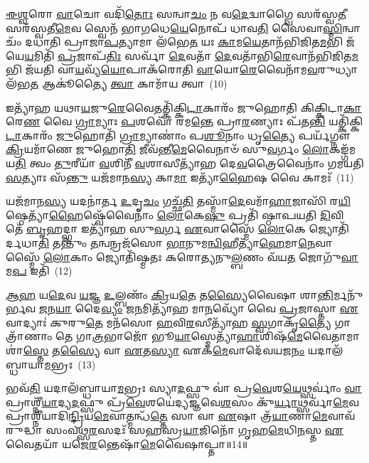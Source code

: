 \-\ul{𑌈}\-\-\ul{𑌶𑍍𑌵}\-𑌰𑍋 \ul{𑌵𑌾}\-𑌚𑍋 𑌵𑌦𑌿᳴\-\ul{𑌤𑍋𑌃} 𑌸𑌨𑍍𑌵𑌾\-\ul{𑌚𑌂} 𑌨 𑌵\-\ul{𑌦𑍇}\-𑌦𑍍𑌵𑌾𑌗𑍍𑌵𑍈 𑌸𑌰᳴𑌸𑍍𑌵\-\ul{𑌤𑍀} 𑌸𑌰᳴𑌸𑍍𑌵𑌤𑍀\-\ul{𑌮𑍇}\-𑌵 𑌸𑍍𑌵𑍇𑌨᳴ 𑌭𑌾\-\ul{𑌗}\-𑌧𑍇\-\ul{𑌯𑍇}\-𑌨𑍋𑌪᳴ 𑌧𑌾𑌵\-\ul{𑌤𑌿} 𑌸𑍈𑌵𑌾\-\ul{𑌸𑍍𑌮𑌿}\-𑌨𑍍𑌵𑌾𑌚𑌂᳴ 𑌦𑌧𑌾𑌤𑌿 𑌪𑍍𑌰𑌾𑌜𑌾\-\ul{𑌪}\-𑌤𑍍𑌯𑌾𑌮𑌾 𑌲᳴𑌭𑍇\-\ul{𑌤} 𑌯𑌃 \ul{𑌕𑌾}\-𑌮\-\ul{𑌯𑍇}\-𑌤𑌾𑌨᳴𑌭𑌿𑌜𑌿𑌤\-\ul{𑌮}\-𑌭𑌿 𑌜᳴𑌯𑍇\-\ul{𑌯}\-𑌮𑌿𑌤𑌿᳴ \ul{𑌪𑍍𑌰}\-𑌜𑌾𑌪᳴\-\ul{𑌤𑌿𑌃} 𑌸𑌰𑍍𑌵𑌾᳴ \ul{𑌦𑍇}\-𑌵𑌤𑌾᳴ \ul{𑌦𑍇}\-𑌵𑌤𑌾᳴𑌭𑌿\-\ul{𑌰𑍇}\-𑌵𑌾𑌨᳴𑌭𑌿\-𑌜𑌿𑌤\-\ul{𑌮}\-𑌭𑌿 𑌜᳴𑌯𑌤𑌿 𑌵𑌾\-\ul{𑌯}\-𑌵𑍍𑌯᳴\-\ul{𑌯𑍋}\-𑌪𑌾𑌕᳴𑌰𑍋𑌤𑌿 \ul{𑌵𑌾}\-𑌯𑍋\-\ul{𑌰𑍇}\-𑌵𑍈𑌨𑌾᳴𑌮\-\ul{𑌵}\-𑌰𑍁𑌧𑍍𑌯𑌾 𑌲᳴𑌭\-\ul{𑌤} 𑌆𑌕𑍂॑𑌤𑍍𑌯𑍈 \ul{𑌤𑍍𑌵𑌾} 𑌕𑌾𑌮𑌾᳴𑌯 𑌤𑍍𑌵𑌾~(10)

𑌇𑌤𑍍𑌯𑌾᳴𑌹 𑌯𑌥𑌾\-\ul{𑌯}\-𑌜𑍁\-\ul{𑌰𑍇}\-𑌵𑍈𑌤𑌤𑍍𑌕𑌿᳴𑌕𑍍𑌕𑌿\-\ul{𑌟𑌾}\-𑌕𑌾𑌰𑌂᳴ 𑌜𑍁𑌹𑍋𑌤𑌿 𑌕𑌿𑌕𑍍𑌕𑌿𑌟𑌾\-\ul{𑌕𑌾}\-𑌰𑍇\-\ul{𑌣} 𑌵𑍈 \ul{𑌗𑍍𑌰𑌾}\-𑌮𑍍𑌯𑌾𑌃 \ul{𑌪}\-𑌶𑌵𑍋᳴ 𑌰𑌮\-\ul{𑌨𑍍𑌤𑍇} 𑌪𑍍𑌰𑌾\-\ul{𑌰}\-𑌣𑍍𑌯𑌾𑌃 𑌪᳴𑌤\-\ul{𑌨𑍍𑌤𑌿} 𑌯𑌤𑍍𑌕𑌿᳴𑌕𑍍𑌕𑌿\-\ul{𑌟𑌾}\-𑌕𑌾𑌰𑌂᳴ \ul{𑌜𑍁}\-𑌹𑍋𑌤𑌿᳴ \ul{𑌗𑍍𑌰𑌾}\-𑌮𑍍𑌯𑌾𑌣𑌾𑌂॑ 𑌪\-\ul{𑌶𑍂}\-𑌨𑌾𑌂 𑌧𑍃\-\ul{𑌤𑍍𑌯𑍈} 𑌪𑌰𑍍𑌯᳴𑌗𑍍𑌨𑍗 \ul{𑌕𑍍𑌰𑌿}\-𑌯𑌮𑌾᳴𑌣𑍇 𑌜𑍁𑌹𑍋\-\ul{𑌤𑌿} 𑌜𑍀𑌵᳴𑌨𑍍𑌤𑍀\-\ul{𑌮𑍇}\-𑌵𑍈𑌨𑌾𑍞᳴ 𑌸𑍁\-\ul{𑌵}\-𑌰𑍍𑌗𑌂 \ul{𑌲𑍋}\-𑌕𑌙𑍍𑌗᳴𑌮𑌯\-\ul{𑌤𑌿} 𑌤𑍍𑌵𑌂 \ul{𑌤𑍁}\-𑌰𑍀𑌯𑌾᳴ \ul{𑌵}\-𑌶𑌿𑌨𑍀᳴ \ul{𑌵}\-𑌶𑌾𑌸𑍀𑌤𑍍𑌯𑌾᳴𑌹 𑌦𑍇\-\ul{𑌵}\-𑌤𑍍𑌰𑍈𑌵𑍈𑌨𑌾𑌂॑ 𑌗𑌮𑌯𑌤𑌿 \ul{𑌸}\-𑌤𑍍𑌯𑌾𑌃 𑌸᳴\-\ul{𑌨𑍍𑌤𑍁} 𑌯𑌜᳴𑌮𑌾𑌨\-\ul{𑌸𑍍𑌯} 𑌕𑌾\-\ul{𑌮𑌾} 𑌇𑌤𑍍𑌯𑌾᳴\-\ul{𑌹𑍈}\-𑌷 𑌵𑍈 𑌕𑌾𑌮𑌃᳴~(11)

𑌯𑌜᳴𑌮𑌾𑌨\-\ul{𑌸𑍍𑌯} 𑌯𑌦𑌨𑌾॑𑌰𑍍𑌤 \ul{𑌉}\-𑌦𑍃\-\ul{𑌚𑌂} 𑌗𑌚𑍍𑌛᳴\-\ul{𑌤𑌿} 𑌤𑌸𑍍𑌮𑌾᳴\-\ul{𑌦𑍇}\-𑌵𑌮𑌾᳴\-\ul{𑌹𑌾}\-𑌜𑌾𑌸𑌿᳴ 𑌰\-\ul{𑌯𑌿}\-𑌷𑍍𑌠𑍇𑌤𑍍𑌯𑌾᳴\-\ul{𑌹𑍈}\-𑌷𑍍𑌵𑍇᳴𑌵𑍈𑌨𑌾𑌂॑ \ul{𑌲𑍋}\-𑌕𑍇\-\ul{𑌷𑍁} 𑌪𑍍𑌰𑌤𑌿᳴ 𑌷𑍍𑌠𑌾𑌪𑌯𑌤𑌿 \ul{𑌦𑌿}\-𑌵𑌿 𑌤𑍇᳴ \ul{𑌬𑍃}\-𑌹𑌦𑍍𑌭𑌾 𑌇𑌤𑍍𑌯𑌾᳴𑌹 𑌸𑍁\-\ul{𑌵}\-𑌰𑍍𑌗 \ul{𑌏}\-𑌵𑌾𑌸𑍍𑌮𑍈᳴ \ul{𑌲𑍋}\-𑌕𑍇 𑌜𑍍𑌯𑍋𑌤𑌿᳴𑌰𑍍𑌦𑌧𑌾\-\ul{𑌤𑌿} 𑌤𑌨𑍍𑌤𑍁𑌂᳴ \ul{𑌤}\-𑌨𑍍𑌵𑌨𑍍𑌰𑌜᳴𑌸𑍋 \ul{𑌭𑌾}\-𑌨𑍁𑌮\-\ul{𑌨𑍍𑌵𑌿}\-𑌹𑍀𑌤𑍍𑌯𑌾᳴\-\ul{𑌹𑍇}\-𑌮𑌾\-\ul{𑌨𑍇}\-𑌵𑌾𑌸𑍍𑌮𑍈᳴ \ul{𑌲𑍋}\-𑌕𑌾𑌂 𑌜𑍍𑌯𑍋𑌤𑌿᳴𑌷𑍍𑌮𑌤𑌃 𑌕𑌰𑍋𑌤𑍍𑌯𑌨𑍁\-\ul{𑌲𑍍𑌬}\-𑌣𑌂 𑌵᳴𑌯\-\ul{𑌤} 𑌜𑍋𑌗𑍁᳴\-\ul{𑌵𑌾}\-𑌮\-\ul{𑌪} 𑌇𑌤𑌿᳴~(12)

\-\ul{𑌆}\-\-\ul{𑌹} 𑌯\-\ul{𑌦𑍇}\-𑌵 \ul{𑌯}\-𑌜𑍍𑌞 \ul{𑌉}\-𑌲𑍍𑌬𑌣𑌂᳴ \ul{𑌕𑍍𑌰𑌿}\-𑌯\-\ul{𑌤𑍇} 𑌤\-\ul{𑌸𑍍𑌯𑍈}\-𑌵𑍈𑌷𑌾 𑌶𑌾\-\ul{𑌨𑍍𑌤𑌿}\-𑌰𑍍𑌮𑌨𑍁᳴𑌰𑍍𑌭𑌵 \ul{𑌜}\-𑌨\-\ul{𑌯𑌾} 𑌦𑍈\-\ul{𑌵𑍍𑌯𑌂} 𑌜\-\ul{𑌨}\-𑌮𑌿𑌤𑍍𑌯𑌾᳴𑌹 𑌮𑌾\-\ul{𑌨}\-𑌵𑍍𑌯𑍋᳴ 𑌵𑍈 \ul{𑌪𑍍𑌰}\-𑌜𑌾𑌸𑍍𑌤𑌾 \ul{𑌏}\-𑌵𑌾𑌦𑍍𑌯𑌾𑌃॑ 𑌕𑍁𑌰𑍁\-\ul{𑌤𑍇} 𑌮𑌨᳴𑌸𑍋 \ul{𑌹}\-𑌵𑌿\-\ul{𑌰}\-𑌸𑍀𑌤𑍍𑌯𑌾᳴𑌹 \ul{𑌸𑍍𑌵}\-𑌗𑌾𑌕𑍃᳴\-\ul{𑌤𑍍𑌯𑍈} 𑌗𑌾𑌤𑍍𑌰𑌾᳴𑌣𑌾𑌂 𑌤𑍇 𑌗𑌾\-\ul{𑌤𑍍𑌰}\-𑌭𑌾𑌜𑍋᳴ 𑌭𑍂\-\ul{𑌯𑌾}\-𑌸𑍍𑌮𑍇𑌤𑍍𑌯𑌾᳴\-\ul{𑌹𑌾}\-𑌶𑌿𑌷᳴\-\ul{𑌮𑍇}\-𑌵𑍈𑌤𑌾𑌮𑌾 𑌶𑌾॑\-\ul{𑌸𑍍𑌤𑍇} 𑌤\-\ul{𑌸𑍍𑌯𑍈} 𑌵𑌾 \ul{𑌏}\-𑌤\-\ul{𑌸𑍍𑌯𑌾} 𑌏𑌕᳴\-\ul{𑌮𑍇}\-𑌵𑌾𑌦𑍇᳴𑌵𑌯𑌜\-\ul{𑌨𑌂} 𑌯𑌦𑌾𑌲᳴𑌬𑍍𑌧𑌾𑌯𑌾\-\ul{𑌮}\-𑌭𑍍𑌰𑌃~(13)

𑌭𑌵᳴\-\ul{𑌤𑌿} 𑌯𑌦𑌾𑌲᳴𑌬𑍍𑌧𑌾𑌯𑌾\-\ul{𑌮}\-𑌭𑍍𑌰𑌃 𑌸𑍍𑌯𑌾\-\ul{𑌦}\-𑌫𑍍𑌸𑍁 𑌵𑌾॑ 𑌪𑍍𑌰\-\ul{𑌵𑍇}\-𑌶\-\ul{𑌯𑍇}\-𑌥𑍍𑌸𑌰𑍍𑌵𑌾𑌂॑ \ul{𑌵𑌾} 𑌪𑍍𑌰𑌾𑌶𑍍𑌨𑍀᳴\-\ul{𑌯𑌾}\-𑌦𑍍𑌯\-\ul{𑌦}\-𑌫𑍍𑌸𑍁 𑌪𑍍𑌰᳴\-\ul{𑌵𑍇}\-𑌶𑌯𑍇॑𑌦𑍍𑌯𑌜𑍍𑌞𑌵𑍇\-\ul{𑌶}\-𑌸𑌂 𑌕𑍁᳴\-\ul{𑌰𑍍𑌯𑌾}\-𑌥𑍍𑌸𑌰𑍍𑌵𑌾᳴\-\ul{𑌮𑍇}\-𑌵 𑌪𑍍𑌰𑌾𑌶𑍍𑌨𑍀᳴𑌯𑌾𑌦𑌿\-\ul{𑌨𑍍𑌦𑍍𑌰𑌿}\-𑌯\-\ul{𑌮𑍇}\-𑌵𑌾𑌤𑍍𑌮𑌨𑍍𑌧᳴\-\ul{𑌤𑍍𑌤𑍇} 𑌸𑌾 𑌵𑌾 \ul{𑌏}\-𑌷𑌾 𑌤𑍍𑌰᳴\-\ul{𑌯𑌾}\-𑌣𑌾\-\ul{𑌮𑍇}\-𑌵𑌾𑌵᳴𑌰𑍁𑌦𑍍𑌧𑌾 𑌸𑌂𑌵𑌥𑍍𑌸\-\ul{𑌰}\-𑌸𑌦𑌃᳴ 𑌸𑌹𑌸𑍍𑌰\-\ul{𑌯𑌾}\-𑌜𑌿𑌨𑍋᳴ 𑌗𑍃𑌹\-\ul{𑌮𑍇}\-𑌧𑌿\-\ul{𑌨}\-𑌸𑍍𑌤 \ul{𑌏}\-𑌵𑍈𑌤𑌯𑌾᳴ 𑌯𑌜𑍇\-\ul{𑌰}\-𑌨𑍍𑌤𑍇𑌷𑌾᳴\-\ul{𑌮𑍇}\-𑌵𑍈𑌷𑌾𑌪𑍍𑌤𑌾॥14॥

